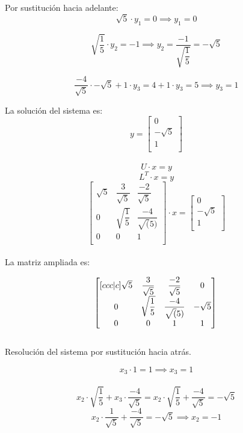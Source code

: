 \documentclass{article}
\begin{document}
Por sustitución hacia adelante:
\[
\sqrt{5} \cdot y_1 = 0 \implies y_1 = 0
\]

\[
\sqrt{\dfrac{1}{5}} \cdot y_2 = -1 \implies y_2 = \dfrac{-1}{\sqrt{\dfrac{1}{5}}} = -\sqrt{5}
\]

\[
\dfrac{-4}{\sqrt{5}} \cdot -\sqrt{5}
+ 1 \cdot y_3 = 
4 + 1 \cdot y_3 = 
5 \implies y_3 = 1
\]

La solución del sistema es:
\[
    y =
    \begin{bmatrix}
    0 \\
    -\sqrt{5} \\
    1 \\
    \end{bmatrix}
\]\\

\[
U \cdot x = y
\]
\[
L^T \cdot x = y
\]
\[
\begin{bmatrix}
\sqrt{5} & \dfrac{3}{\sqrt{5}} & \dfrac{-2}{\sqrt{5}} \\
0 & \sqrt{\dfrac{1}{5}} & \dfrac{-4}{\sqrt(5)} \\
0 & 0 & 1 \\
\end{bmatrix} 
\cdot x = 
\begin{bmatrix}
    0 \\
    -\sqrt{5} \\
    1 \\
    \end{bmatrix}
\]\\

La matriz ampliada es:

\[ 
\begin{bmatrix}[ccc|c]
\sqrt{5} & \dfrac{3}{\sqrt{5}} & \dfrac{-2} {\sqrt{5}} & 0 \\
0 & \sqrt{\dfrac{1}{5}} & \dfrac{-4}{\sqrt(5)} &  -\sqrt{5}\\
0 & 0 & 1 & 1 \\
\end{bmatrix}\\
\]\\

Resolución del sistema por sustitución hacia atrás.

\[
x_3 \cdot 1 = 1 \implies x_3 = 1 
\]\\

\[
x_2 \cdot \sqrt{\dfrac{1}{5}} + x_3 \cdot \dfrac{-4}{\sqrt{5}} =
x_2 \cdot \sqrt{\dfrac{1}{5}} + \dfrac{-4}{\sqrt{5}} = -\sqrt{5}
\]
\[
x_2 \cdot \dfrac{1}{\sqrt{5}} + \dfrac{-4}{\sqrt{5}} = -\sqrt{5}
\implies x_2 = -1
\]\\
\end{document}
